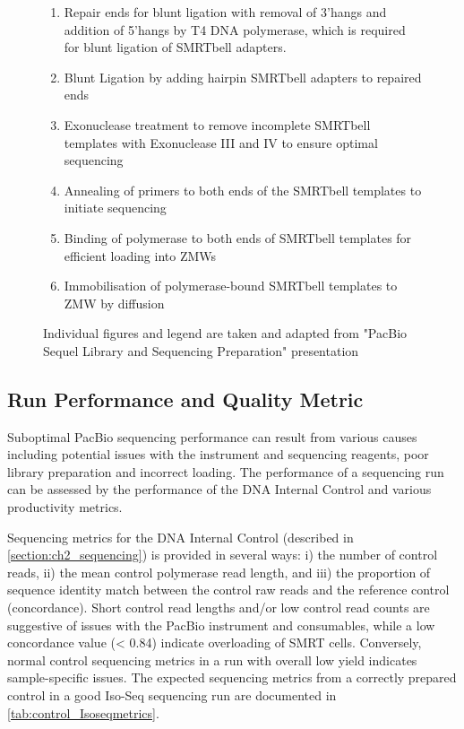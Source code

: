 \begin{figure}[!htp]
{\begin{enumerate}
			\item Repair ends for blunt ligation with removal of 3'hangs and addition of 5'hangs by T4 DNA polymerase, which is required for blunt ligation of SMRTbell adapters. 
			\item Blunt Ligation by adding hairpin SMRTbell adapters to repaired ends
			\item Exonuclease treatment to remove incomplete SMRTbell templates with Exonuclease III and IV to ensure optimal sequencing
			\item Annealing of primers to both ends of the SMRTbell templates to initiate sequencing 
			\item Binding of polymerase to both ends of SMRTbell templates for efficient loading into ZMWs
			\item Immobilisation of polymerase-bound SMRTbell templates to ZMW by diffusion
			\\
		\end{enumerate} 
		Individual figures and legend are taken and adapted from "PacBio Sequel Library and Sequencing Preparation" presentation
	}
	\label{fig:isoseq_labworkflow}
\end{figure}

\clearpage
\subsection{Run Performance and Quality Metric}
\label{sec: Isoseq_run_performance}
Suboptimal PacBio sequencing performance can result from various causes including potential issues with the instrument and sequencing reagents, poor library preparation and incorrect loading. The performance of a sequencing run can be assessed by the performance of the DNA Internal Control and various productivity metrics. 

Sequencing metrics for the DNA Internal Control (described in \cref{section:ch2_sequencing}) is provided in several ways: i) the number of control reads, ii) the mean control polymerase read length, and iii) the proportion of sequence identity match between the control raw reads and the reference control (concordance). Short control read lengths and/or low control read counts are suggestive of issues with the PacBio instrument and consumables, while a low concordance value (< 0.84) indicate overloading of SMRT cells. Conversely, normal control sequencing metrics in a run with overall low yield indicates sample-specific issues. The expected sequencing metrics from a correctly prepared control in a good Iso-Seq sequencing run are documented in \cref{tab:control_Isoseqmetrics}. 

